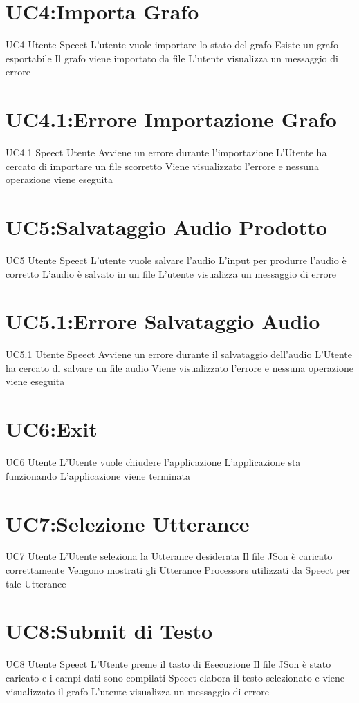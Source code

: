 \documentclass[../AnalisideiRequisiti.tex]{subfiles}
\begin{document}
\section{UC4:Importa Grafo}
\UserCase
{UC4}
{Utente}
{Speect}
{L'utente vuole importare lo stato del grafo}
{Esiste un grafo esportabile}
{Il grafo viene importato da file}
{L'utente visualizza un messaggio di errore }
{}
\section{UC4.1:Errore Importazione Grafo}
\UserCase
{UC4.1}
{Speect}
{Utente}
{Avviene un errore durante l'importazione}
{L'Utente ha cercato di importare un file scorretto}
{Viene visualizzato l'errore e nessuna operazione viene eseguita}
{}
{}
\section{UC5:Salvataggio Audio Prodotto}
\UserCase
{UC5}
{Utente}
{Speect}
{L'utente vuole salvare l'audio}
{L'input per produrre l'audio è corretto}
{L'audio è salvato in un file}
{L'utente visualizza un messaggio di errore }
{}
\section{UC5.1:Errore Salvataggio Audio}
\UserCase
{UC5.1}
{Utente}
{Speect}
{Avviene un errore durante il salvataggio dell'audio}
{L'Utente ha cercato di salvare un file audio}
{Viene visualizzato l'errore e nessuna operazione viene eseguita}
{}
{}
\section{UC6:Exit}
\UserCase
{UC6}
{Utente}
{}
{L'Utente vuole chiudere l'applicazione }
{L'applicazione sta funzionando}
{L'applicazione viene terminata}
{}
{
}

\section{UC7:Selezione Utterance}
\UserCase
{UC7}
{Utente}
{}
{L'Utente seleziona la Utterance desiderata }
{Il file JSon è caricato correttamente}
{Vengono mostrati gli Utterance Processors utilizzati da Speect per tale Utterance}
{}
{}

\section{UC8:Submit di Testo}
\UserCase
{UC8}
{Utente}
{Speect}
{L'Utente preme il tasto di Esecuzione }
{Il file JSon è stato caricato e i campi dati sono compilati}
{Speect elabora il testo selezionato e viene visualizzato il grafo}
{L'utente visualizza un messaggio di errore }
{}
\end{document}
